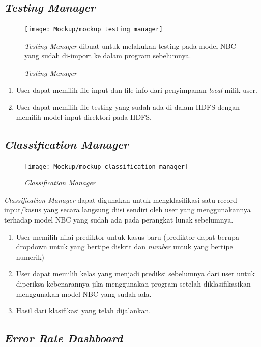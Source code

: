 \subsection{\textit{Testing Manager}}
\label{subsec:Testing Manager}

\begin{figure}[H]
	\centering
	\texttt{[image: Mockup/mockup\_testing\_manager]}
	\caption[\textit{Testing Manager}]{\textit{Testing Manager}}
	\label{fig:Testing Manager}
\textit{Testing Manager} dibuat untuk melakukan testing pada model NBC yang sudah di-import ke dalam program sebelumnya.
\end{figure}
\begin{enumerate}
	\item User dapat memilih file input dan file info dari penyimpanan \textit{local} milik user.
	\item User dapat memilih file testing yang sudah ada di dalam HDFS dengan memilih model input direktori pada HDFS.
\end{enumerate}

\subsection{\textit{Classification Manager}}
\label{subsec:Classification Manager}

\begin{figure}[H]
	\centering
	\texttt{[image: Mockup/mockup\_classification\_manager]}
	\caption[\textit{Classification Manager}]{\textit{Classification Manager}}
	\label{fig:Classification Manager}
\end{figure}
\textit{Classification Manager} dapat digunakan untuk mengklasifikasi satu record input/kasus yang secara langsung diisi sendiri oleh user yang menggunakannya terhadap model NBC yang sudah ada pada perangkat lunak sebelumnya.
\begin{enumerate}
	\item User memilih nilai prediktor untuk kasus baru (prediktor dapat berupa dropdown untuk yang bertipe diskrit dan \textit{number} untuk yang bertipe numerik)
	\item User dapat memilih kelas yang menjadi prediksi sebelumnya dari user untuk diperiksa kebenarannya jika menggunakan program setelah diklasifikasikan menggunakan model NBC yang sudah ada.
	\item Hasil dari klasifikasi yang telah dijalankan.
\end{enumerate}

\subsection{\textit{Error Rate Dashboard}}
\label{subsec:Error Rate Dashboard}

